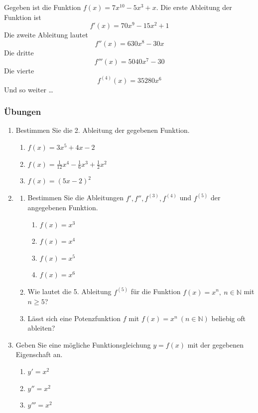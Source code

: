 \begin{example}
    Gegeben ist die Funktion $f(x)=7x^{10}-5x^3+x$. Die erste Ableitung der Funktion ist
    $$f'(x)=70x^9-15x^2+1$$
    Die zweite Ableitung lautet
    $$f''(x)=630x^8-30x$$
    Die dritte
    $$f'''(x)=5040x^7-30$$
    Die vierte
    $$f^{(4)}(x)=35280x^6$$
    Und so weiter \dots
\end{example}
\clearpage
\subsubsection*{Übungen}
\begin{enumerate}
    \item Bestimmen Sie die 2. Ableitung der gegebenen Funktion.
          \begin{enumerate}
              \item \( f(x) = 3x^5 + 4x - 2 \)
              \item \( f(x) = \frac{1}{12}x^4 - \frac{1}{6}x^3 + \frac{1}{2}x^2 \)
              \item \( f(x) = (5x - 2)^2 \)
          \end{enumerate}
    \item
          \begin{enumerate}
              \item Bestimmen Sie die Ableitungen \( f', f'', f^{(3)}, f^{(4)} \) und \( f^{(5)} \) der angegebenen Funktion.
                    \begin{enumerate}
                        \item \( f(x) = x^3 \)
                        \item \( f(x) = x^4 \)
                        \item \( f(x) = x^5 \)
                        \item \( f(x) = x^6 \)
                    \end{enumerate}
              \item Wie lautet die 5. Ableitung \( f^{(5)} \) für die Funktion \( f(x) = x^n,\ n \in \mathbb{N} \) mit \( n \geq 5 \)?
              \item Lässt sich eine Potenzfunktion \( f \) mit \( f(x) = x^n \ (n \in \mathbb{N}) \) beliebig oft ableiten?
          \end{enumerate}

    \item Geben Sie eine mögliche Funktionsgleichung \( y = f(x) \) mit der gegebenen Eigenschaft an.
          \begin{enumerate}
              \item \( y' = x^2 \)
              \item \( y'' = x^2 \)
              \item \( y''' = x^2 \)
          \end{enumerate}


\end{enumerate}
